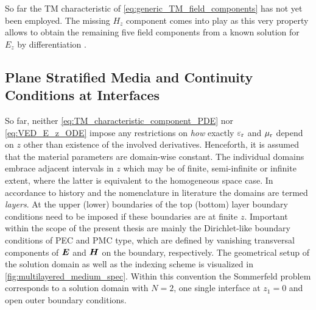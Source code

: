 So far the \ac{TM} characteristic of \eqref{eq:generic_TM_field_components} has
not yet been employed.
The missing $H_z$ component comes into play as this very property allows
to obtain the remaining five field components from a known solution for $E_z$
by differentiation \cite[\S\S2.3.3]{Chew1999}.







\subsection{Plane Stratified Media and Continuity Conditions at Interfaces}
\label{subsec:layered_media_and_continuity_conditions}

So far, neither \eqref{eq:TM_characteristic_component_PDE} nor
\eqref{eq:VED_E_z_ODE} impose any restrictions on \emph{how} exactly $\varepsilon_{\mathrm{r}}$
and $\mu_{\mathrm{r}}$ depend on $z$ other than existence of the involved derivatives.
Henceforth, it is assumed that the material parameters are domain-wise
constant.
The individual domains embrace adjacent intervals in $z$ which may be of finite,
semi-infinite or infinite extent, where the latter is equivalent to the
homogeneous space case.
In accordance to history and the nomenclature in literature the domains are
termed \emph{layers}.
At the upper (lower) boundaries of the top (bottom) layer boundary conditions 
need to be imposed if these boundaries are at finite $z$.
Important within the scope of the present thesis are mainly the Dirichlet-like
boundary conditions of \ac{PEC} and \ac{PMC} type, which are defined by
vanishing transversal components of $\pvec{E}$ and $\pvec{H}$ on the boundary,
respectively.
The geometrical setup of the solution domain as well as the indexing scheme is
visualized in \cref{fig:multilayered_medium_spec}.
Within this convention the Sommerfeld problem corresponds to a solution domain
with $N=2$, one single interface at $z_1 = 0$ and open outer boundary
conditions.

